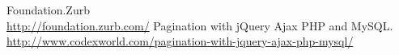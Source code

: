\begin{thebibliography}{99999}
\singlespace\normalsize
{}Foundation.Zurb\\\url{http://foundation.zurb.com/}
Pagination with jQuery Ajax PHP and MySQL.\\
\url{http://www.codexworld.com/pagination-with-jquery-ajax-php-mysql/}
\end{thebibliography}
